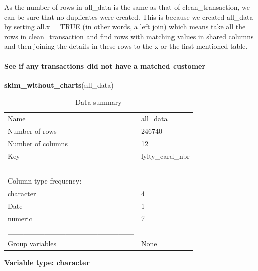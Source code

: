 \documentclass[
]{article}
\newenvironment{Shaded}{\begin{snugshade}}{\end{snugshade}}
\newcommand{\FunctionTok}[1]{\textcolor[rgb]{0.13,0.29,0.53}{\textbf{#1}}}
\newcommand{\NormalTok}[1]{#1}
\begin{document}
As the number of rows in all\_data is the same as that of
clean\_transaction, we can be sure that no duplicates were created. This
is because we created all\_data by setting all.x = TRUE (in other words,
a left join) which means take all the rows in clean\_transaction and
find rows with matching values in shared columns and then joining the
details in these rows to the x or the first mentioned table.

\hypertarget{see-if-any-transactions-did-not-have-a-matched-customer}{%
\paragraph{See if any transactions did not have a matched
customer}\label{see-if-any-transactions-did-not-have-a-matched-customer}}

\begin{Shaded}
\begin{Highlighting}[]
\FunctionTok{skim\_without\_charts}\NormalTok{(all\_data)}
\end{Highlighting}
\end{Shaded}

\begin{longtable}[]{@{}ll@{}}
\caption{Data summary}\tabularnewline
\toprule\noalign{}
\endfirsthead
\endhead
\bottomrule\noalign{}
\endlastfoot
Name & all\_data \\
Number of rows & 246740 \\
Number of columns & 12 \\
Key & lylty\_card\_nbr \\
\_\_\_\_\_\_\_\_\_\_\_\_\_\_\_\_\_\_\_\_\_\_\_ & \\
Column type frequency: & \\
character & 4 \\
Date & 1 \\
numeric & 7 \\
\_\_\_\_\_\_\_\_\_\_\_\_\_\_\_\_\_\_\_\_\_\_\_\_ & \\
Group variables & None \\
\end{longtable}

\textbf{Variable type: character}
\end{document}
